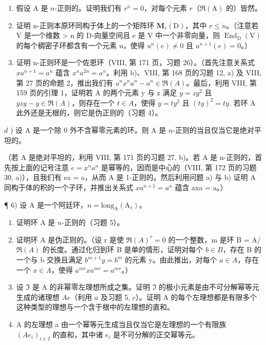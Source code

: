 \begin{enumerate}
\def\labelenumi{\alph{enumi})}
\item
  假设 \(\mathrm{A}\) 是 \(n\)-正则的。证明我们有 \(r^n = 0\)，对每个元素 \(r\)（\(\Re(\mathrm{A})\) 的）皆然。
\item
  证明 n-正则本原环同构于体上的一个矩阵环 \(\mathbf{M}_{r}(\mathrm{D})\)，其中 \(r \leqslant n\)。（注意若 V 是一个维数 \textgreater{} n 的 D-向量空间且 e 是 V 中一个非零向量，则 \(\operatorname{End}_{\mathrm{D}}(\mathrm{V})\) 的每个稠密子环都含有一个元素 u，使得 \(u^{n}(e) \neq 0\) 且 \(u^{n+1}(e) = 0\)。）
\item
  证明 n-正则环是一个佐恩环（VIII, 第 171 页，习题 26）。（首先注意关系式 \(xa^{n+1}=a^{n}\) 蕴含 \(x^{n}a^{2n}=a^{n}\)。利用 b)、VIII, 第 168 页的习题 12, a) 及 VIII, 第 27 页的命题 2，推出我们有 \(a^{n}x^{n}a^{n}-a^{n}\in\Re(A)\)。最后，利用 VIII, 第 159 页的引理 1，证明若 A 的两个元素 y 与 z 满足 \(y=zy^{2}\) 且 \(yzy-y\in\Re(A)\)，则存在一个 \(t\in A\)，使得 \(y=ty^{2}\) 且 \((ty)^{2}=ty.\) 若环 A 此外还是无根的，则它是伪正则的（习题 4）。
\end{enumerate}

\(d\) ) 设 A 是一个除 0 外不含幂零元素的环。则 A 是 \(n\)-正则的当且仅当它是绝对平坦的。

（若 A 是绝对平坦的，利用 VIII, 第 171 页的习题 27, b)。若 A 是 n-正则的，首先按上面的记号注意 \(e = x^{n}a^{n}\) 是幂等的，因而是中心的（VIII, 第 172 页的习题 30, a)），且我们有 ea = a，从而 A 是 1-正则的。然后利用问题 a) 与 b) 证明 A 同构于体的积的一个子环，并推出关系式 \(xa^{n+1} = a^{n}\) 蕴含 axa = a。）

¶ 6) 设 A 是一个阿廷环，\(n = \text{long}_{\text{A}}(\text{A}_s)\)。

\begin{enumerate}
\def\labelenumi{\alph{enumi})}
\item
  证明环 A 是 \(n\)-正则的（习题 5）。
\item
  证明环 A 是伪正则的。（设 r 是使 \(\Re(A)^{r}=0\) 的一个整数，m 是环 B = A/ \(\Re(A)\) 的长度。通过化归到环 B 是单的情形，证明对每个 \(b\in B\)，存在 B 的一个与 b 交换且满足 \(b^{m+1}y=b^{m}\) 的元素 y。由此推出，对每个 \(a\in A\)，存在一个 \(x\in A\)，使得 \(a^{mr}xa^{mr}=a^{mr}\)。）
\item
  设 \(\mathfrak{I}\) 是 A 的非幂零左理想所成之集。证明 \(\mathfrak{I}\) 的极小元素是由不可分解幂等元生成的诸理想 \(Ae\)（利用 \(a\) 及习题 5, \(c\)）。证明 A 的每个左理想都是有限多个这种类型的理想与一个含于根中的左理想的直和。
\item
  A 的左理想 a 由一个幂等元生成当且仅当它是左理想的一个有限族 \((Ae_{i})_{i\in I}\) 的直和，其中诸 \(e_{i}\) 是不可分解的正交幂等元。
\end{enumerate}


